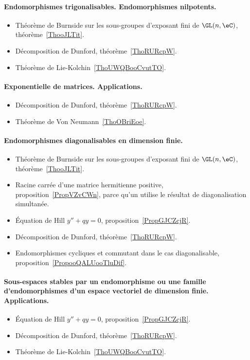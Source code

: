 \paragraph{Endomorphismes trigonalisables. Endomorphismes nilpotents.}
\begin{itemize}
    \item Théorème de Burnside sur les sous-groupes d'exposant fini de \( \GL(n,\eC)\), théorème~\ref{ThooJLTit}.
    \item Décomposition de Dunford, théorème~\ref{ThoRURcpW}.
    \item Théorème de Lie-Kolchin~\ref{ThoUWQBooCvutTO}.
\end{itemize}
\paragraph{Exponentielle de matrices. Applications.}
\begin{itemize}
    \item Décomposition de Dunford, théorème~\ref{ThoRURcpW}.
    \item Théorème de Von Neumann~\ref{ThoOBriEoe}.
\end{itemize}
\paragraph{Endomorphismes diagonalisables en dimension finie.}
\begin{itemize}
    \item Théorème de Burnside sur les sous-groupes d'exposant fini de \( \GL(n,\eC)\), théorème~\ref{ThooJLTit}.
    \item Racine carrée d'une matrice hermitienne positive, proposition~\ref{PropVZvCWn}, parce qu'un utilise le résultat de diagonalisation simultanée.
    \item Équation de Hill \( y''+qy=0\), proposition~\ref{PropGJCZcjR}.
    \item Décomposition de Dunford, théorème~\ref{ThoRURcpW}.
    \item Endomorphismes cycliques et commutant dans le cas diagonalisable, proposition~\ref{PropooQALUooTluDif}.
\end{itemize}
\paragraph{Sous-espaces stables par un endomorphisme ou une famille d'endomorphismes d’un espace vectoriel de dimension finie. Applications.}
\begin{itemize}
    \item Équation de Hill \( y''+qy=0\), proposition~\ref{PropGJCZcjR}.
    \item Décomposition de Dunford, théorème~\ref{ThoRURcpW}.
    \item Théorème de Lie-Kolchin~\ref{ThoUWQBooCvutTO}.
\end{itemize}

